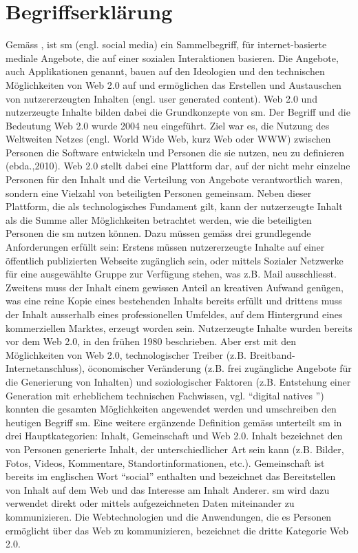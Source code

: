 \section{Begriffserklärung}\label{sec.begriff}
Gemäss , ist \gls{sm} (engl. social media) ein Sammelbegriff, für internet-basierte mediale Angebote, die auf einer sozialen Interaktionen basieren. Die Angebote, auch Applikationen genannt, bauen auf den Ideologien und den technischen Möglichkeiten von Web 2.0 auf \cite{Kaplan:2010} und ermöglichen das Erstellen und Austauschen von nutzererzeugten Inhalten (engl. user generated content).\newline
Web 2.0 und nutzerzeugte Inhalte bilden dabei die Grundkonzepte von \gls{sm}. Der Begriff und die Bedeutung Web 2.0 wurde 2004 neu eingeführt. Ziel war es, die Nutzung des Weltweiten Netzes (engl. World Wide Web, kurz Web oder WWW) zwischen Personen die Software entwickeln und Personen die sie nutzen, neu zu definieren (ebda.,2010). Web 2.0 stellt dabei eine Plattform dar, auf der nicht mehr einzelne Personen für den Inhalt und die Verteilung von Angebote verantwortlich waren, sondern eine Vielzahl von beteiligten Personen gemeinsam. Neben dieser Plattform, die als technologisches Fundament gilt, kann der nutzerzeugte Inhalt als die Summe aller Möglichkeiten betrachtet werden, wie die beteiligten Personen die \gls{sm} nutzen können. Dazu müssen gemäss  drei grundlegende Anforderungen erfüllt sein: Erstens müssen nutzererzeugte Inhalte auf einer öffentlich publizierten Webseite zugänglich sein, oder mittels Sozialer Netzwerke für eine ausgewählte Gruppe zur Verfügung stehen, was z.B. Mail ausschliesst. Zweitens muss der Inhalt einem gewissen Anteil an kreativen Aufwand genügen, was eine reine Kopie eines bestehenden Inhalts bereits erfüllt und drittens muss der Inhalt ausserhalb eines professionellen Umfeldes, auf dem Hintergrund eines kommerziellen Marktes, erzeugt worden sein. Nutzerzeugte Inhalte wurden bereits vor dem Web 2.0, in den frühen 1980 beschrieben. Aber erst mit den Möglichkeiten von Web 2.0, technologischer Treiber (z.B. Breitband-Internetanschluss), öconomischer Veränderung (z.B. frei zugängliche Angebote für die Generierung von Inhalten) und soziologischer Faktoren (z.B. Entstehung einer Generation mit erheblichem technischen Fachwissen, vgl. \textquotedblleft digital natives \textquotedblright) konnten die gesamten Möglichkeiten angewendet werden und umschreiben den heutigen Begriff \gls{sm}.\newline 
Eine weitere ergänzende Definition gemäss  unterteilt \gls{sm} in drei Hauptkategorien: Inhalt, Gemeinschaft und Web 2.0. Inhalt bezeichnet den von Personen generierte Inhalt, der unterschiedlicher Art sein kann (z.B. Bilder, Fotos, Videos, Kommentare, Standortinformationen, etc.). Gemeinschaft ist bereits im englischen Wort \textquotedblleft social\textquotedblright{} enthalten und bezeichnet das Bereitstellen von Inhalt auf dem Web und das Interesse am Inhalt Anderer. \gls{sm} wird dazu verwendet direkt oder mittels aufgezeichneten Daten miteinander zu kommunizieren. Die Webtechnologien und die Anwendungen, die es Personen ermöglicht über das Web zu kommunizieren, bezeichnet die dritte Kategorie Web 2.0. \newline
